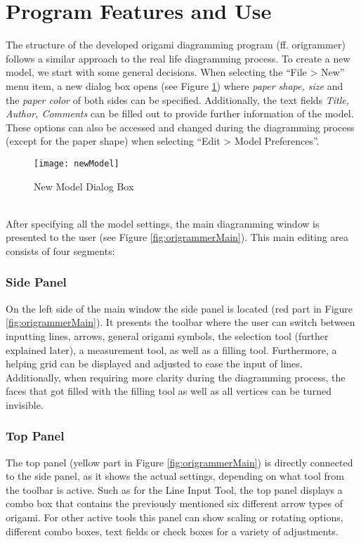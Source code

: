 
\section{Program Features and Use}
\label{program}

The structure of the developed origami diagramming program (ff. \gls{origrammer}) follows a similar approach to the real life diagramming process. To create a new model, we start with some general decisions. When selecting the ``File > New'' menu item, a new dialog box opens (see Figure \ref{fig:newModel}) where \emph{paper shape, size} and the \emph{paper color} of both sides can be specified. Additionally, the text fields \emph{Title, Author, Comments} can be filled out to provide further information of the model. These options can also be accessed and changed during the diagramming process (except for the paper shape) when selecting ``Edit > Model Preferences''.
\begin{figure}[htbp]
	\centering
	\texttt{[image: newModel]}
	\caption{New Model Dialog Box}
	\label{fig:newModel}
\end{figure}\\
After specifying all the model settings, the main diagramming window is presented to the user (see Figure \ref{fig:origrammerMain}). This main editing area consists of four segments:

\subsubsection*{Side Panel}
On the left side of the main window the side panel is located (red part in Figure \ref{fig:origrammerMain}). It presents the toolbar where the user can switch between inputting lines, arrows, general origami symbols, the selection tool (further explained later), a measurement tool, as well as a filling tool. Furthermore, a helping grid can be displayed and adjusted to ease the input of lines. Additionally, when requiring more clarity during the diagramming process, the faces that got filled with the filling tool as well as all vertices can be turned invisible.

\subsubsection*{Top Panel}
The top panel (yellow part in Figure \ref{fig:origrammerMain}) is directly connected to the side panel, as it shows the actual settings, depending on what tool from the toolbar is active. Such as for the Line Input Tool, the top panel displays a combo box that contains the previously mentioned six different arrow types of origami. For other active tools this panel can show scaling or rotating options, different combo boxes, text fields or check boxes for a variety of adjustments.

